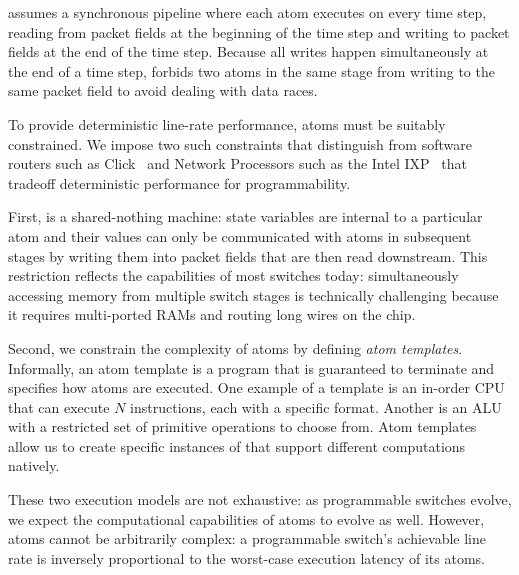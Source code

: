 \smallskip
{}
\absmachine assumes a synchronous pipeline where each atom executes on every
time step, reading from packet fields at the beginning of the time step and
writing to packet fields at the end of the time step. Because all writes happen
simultaneously at the end of a time step, \absmachine forbids two atoms in the
same stage from writing to the same packet field to avoid dealing with data
races.

To provide deterministic line-rate performance, atoms must be suitably
constrained.  We impose two such constraints that distinguish \absmachine from
software routers such as Click~\cite{click} and Network Processors such as the
Intel IXP~\cite{ixp4xx} that tradeoff deterministic performance for
programmability.

First, \absmachine is a shared-nothing machine: state variables are internal to
a particular atom and their values can only be communicated with atoms in
subsequent stages by writing them into packet fields that are then read
downstream.  This restriction reflects the capabilities of most switches today:
simultaneously accessing memory from multiple switch stages is technically
challenging because it requires multi-ported RAMs and routing long wires on the
chip.

Second, we constrain the complexity of atoms by defining {\it atom templates}.
Informally, an atom template is a program that is guaranteed to terminate and
specifies how atoms are executed. One example of a template is an in-order CPU
that can execute $N$ instructions, each with a specific format. Another is an
ALU with a restricted set of primitive operations to choose from. Atom
templates allow us to create specific instances of \absmachine that support
different computations natively.

These two execution models are not exhaustive: as programmable switches evolve,
we expect the computational capabilities of atoms to evolve as well. However,
atoms cannot be arbitrarily complex: a programmable switch's achievable line
rate is inversely proportional to the worst-case execution latency of its
atoms.
